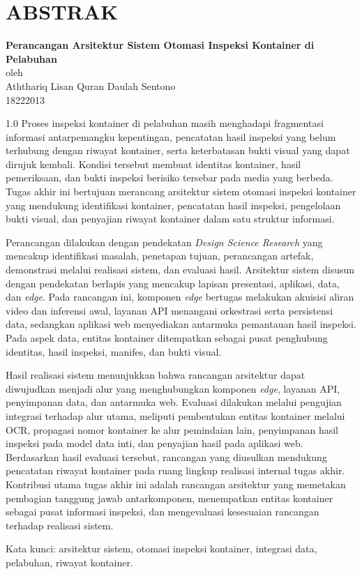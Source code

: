 \chapter*{ABSTRAK}

\begin{center}

    \textbf{Perancangan Arsitektur Sistem Otomasi Inspeksi Kontainer di Pelabuhan} \\
    \vspace{0.4cm}
    oleh \\
    \vspace{0.4cm}
    Aththariq Lisan Quran Daulah Sentono\\
    18222013\\
\end{center}


\begin{spacing}{1.0}
Proses inspeksi kontainer di pelabuhan masih menghadapi fragmentasi informasi
antarpemangku kepentingan, pencatatan hasil inspeksi yang belum terhubung dengan
riwayat kontainer, serta keterbatasan bukti visual yang dapat dirujuk kembali.
Kondisi tersebut membuat identitas kontainer, hasil pemeriksaan, dan bukti
inspeksi berisiko tersebar pada media yang berbeda. Tugas akhir ini bertujuan
merancang arsitektur sistem otomasi inspeksi kontainer yang mendukung
identifikasi kontainer, pencatatan hasil inspeksi, pengelolaan bukti visual, dan
penyajian riwayat kontainer dalam satu struktur informasi.

Perancangan dilakukan dengan pendekatan \textit{Design Science Research} yang
mencakup identifikasi masalah, penetapan tujuan, perancangan artefak,
demonstrasi melalui realisasi sistem, dan evaluasi hasil. Arsitektur sistem
disusun dengan pendekatan berlapis yang mencakup lapisan presentasi, aplikasi,
data, dan \textit{edge}. Pada rancangan ini, komponen \textit{edge} bertugas
melakukan akuisisi aliran video dan inferensi awal, layanan API menangani
orkestrasi serta persistensi data, sedangkan aplikasi web menyediakan antarmuka
pemantauan hasil inspeksi. Pada aspek data, entitas kontainer ditempatkan
sebagai pusat penghubung identitas, hasil inspeksi, manifes, dan bukti visual.

Hasil realisasi sistem menunjukkan bahwa rancangan arsitektur dapat diwujudkan
menjadi alur yang menghubungkan komponen \textit{edge}, layanan API,
penyimpanan data, dan antarmuka web. Evaluasi dilakukan melalui pengujian
integrasi terhadap alur utama, meliputi pembentukan entitas kontainer melalui
OCR, propagasi nomor kontainer ke alur pemindaian lain, penyimpanan hasil
inspeksi pada model data inti, dan penyajian hasil pada aplikasi web. Berdasarkan
hasil evaluasi tersebut, rancangan yang diusulkan mendukung pencatatan riwayat
kontainer pada ruang lingkup realisasi internal tugas akhir. Kontribusi utama
tugas akhir ini adalah rancangan arsitektur yang memetakan pembagian tanggung
jawab antarkomponen, menempatkan entitas kontainer sebagai pusat informasi
inspeksi, dan mengevaluasi kesesuaian rancangan terhadap realisasi sistem.

Kata kunci: arsitektur sistem, otomasi inspeksi kontainer, integrasi data, pelabuhan, riwayat kontainer.
\end{spacing}
